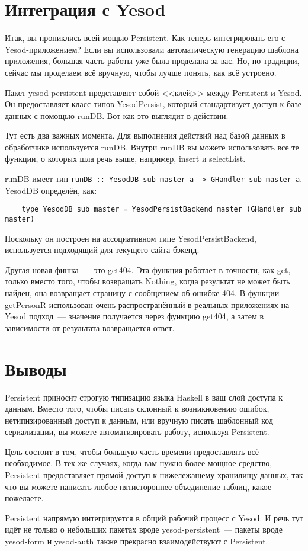 \section{Интеграция с Yesod}

Итак, вы прониклись всей мощью Persistent. Как теперь интегрировать его с
Yesod-приложением? Если вы использовали автоматическую генерацию шаблона
приложения, большая часть работы уже была проделана за вас. Но, по традиции,
сейчас мы проделаем всё вручную, чтобы лучше понять, как всё устроено.

Пакет yesod-persistent представляет собой <<клей>> между Persistent и Yesod. Он
предоставляет класс типов YesodPersist, который стандартизует доступ к базе
данных с помощью runDB. Вот как это выглядит в действии.


Тут есть два важных момента. Для выполнения действий над базой данных в
обработчике используется runDB. Внутри runDB вы можете использовать все те
функции, о которых шла речь выше, например, insert и selectList. 

\begin{remark}
    runDB имеет тип
    \lstinline'runDB :: YesodDB sub master a -> GHandler sub master a'.
    YesodDB определён, как:

    \begin{lstlisting}
    type YesodDB sub master = YesodPersistBackend master (GHandler sub master)
    \end{lstlisting}

    Поскольку он построен на ассоциативном типе YesodPersistBackend,
    используется подходящий для текущего сайта бэкенд.
\end{remark}

Другая новая фишка~--- это get404. Эта функция работает в точности, как get,
только вместо того, чтобы возвращать Nothing, когда результат не может быть
найден, она возвращает страницу с сообщением об ошибке 404. В функции
getPersonR использован очень распространённый в реальных приложениях на Yesod
подход~--- значение получается через функцию get404, а затем в зависимости от
результата возвращается ответ.

\section{Выводы}

Persistent приносит строгую типизацию языка Haskell в ваш слой доступа к
данным. Вместо того, чтобы писать склонный к возникновению ошибок,
нетипизированный доступ к данным, или вручную писать шаблонный код
сериализации, вы можете автоматизировать работу, используя Persistent.

Цель состоит в том, чтобы большую часть времени предоставлять всё необходимое.
В тех же случаях, когда вам нужно более мощное средство, Persistent
предоставляет прямой доступ к нижележащему хранилищу данных, так что вы можете
написать любое пятистороннее объединение таблиц, какое пожелаете.

Persistent напрямую интегрируется в общий рабочий процесс с Yesod. И речь тут
идёт не только о небольших пакетах вроде yesod-persistent~--- пакеты вроде
yesod-form и yesod-auth также прекрасно взаимодействуют с Persistent.
